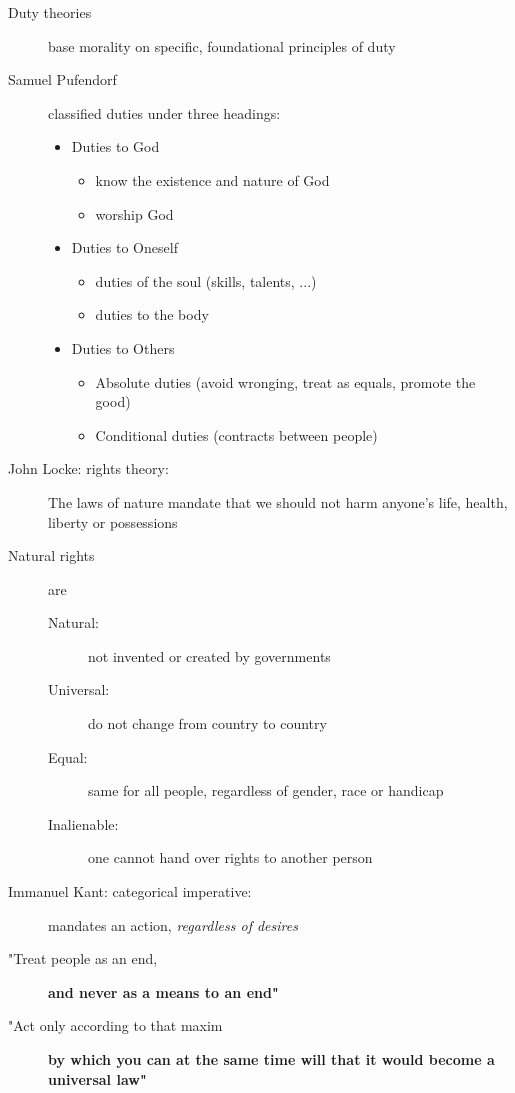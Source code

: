 \documentclass[a4paper]{article}
\begin{document}
\begin{description}
\item[Duty theories] base morality on specific, foundational principles of duty
\item[Samuel Pufendorf] classified duties under three headings:
\begin{itemize}
\item Duties to God
\begin{itemize}
\item know the existence and nature of God
\item worship God
\end{itemize}
\item Duties to Oneself
\begin{itemize}
\item duties of the soul (skills, talents, ...)
\item duties to the body
\end{itemize}
\item Duties to Others
\begin{itemize}
\item Absolute duties (avoid wronging, treat as equals, promote the good)
\item Conditional duties (contracts between people)
\end{itemize}
\end{itemize}
\item[John Locke: rights theory:] The laws of nature mandate that we should not harm anyone's life, health, liberty or possessions
\item[Natural rights] are
\begin{description}
\item[Natural:] not invented or created by governments
\item[Universal:] do not change from country to country
\item[Equal:] same for all people, regardless of gender, race or handicap
\item[Inalienable:] one cannot hand over rights to another person
\end{description}
\item[Immanuel Kant: categorical imperative:] mandates an action, \textit{regardless of desires}
\item["Treat people as an end,] \textbf{and never as a means to an end"}
\item["Act only according to that maxim] \textbf{by which you can at the same time will that it would become a universal law"}
\end{description}
\end{document}
